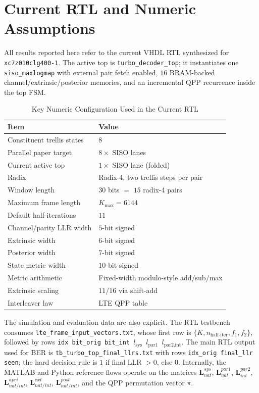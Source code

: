 \documentclass[conference]{IEEEtran}
\begin{document}
\section{Current RTL and Numeric Assumptions}
All results reported here refer to the current VHDL RTL synthesized for \texttt{xc7z010clg400-1}. The active top is \texttt{turbo\_decoder\_top}; it instantiates one \texttt{siso\_maxlogmap} with external pair fetch enabled, \(16\) BRAM-backed channel/extrinsic/posterior memories, and an incremental QPP recurrence inside the top FSM.

\begin{table}[t]
\caption{Key Numeric Configuration Used in the Current RTL}
\label{tab:numerics}
\centering
\footnotesize
\begin{tabular}{>{\raggedright\arraybackslash}p{} >{\raggedright\arraybackslash}p{}}
\toprule
Item & Value \\
\midrule
Constituent trellis states & \(8\) \\
Parallel paper target & \(8\times\) SISO lanes \\
Current active top & \(1\times\) SISO lane (folded) \\
Radix & Radix-4, two trellis steps per pair \\
Window length & \(30\) bits \(=\) \(15\) radix-4 pairs \\
Maximum frame length & \(K_{\max}=6144\) \\
Default half-iterations & \(11\) \\
Channel/parity LLR width & \(5\)-bit signed \\
Extrinsic width & \(6\)-bit signed \\
Posterior width & \(7\)-bit signed \\
State metric width & \(10\)-bit signed \\
Metric arithmetic & Fixed-width modulo-style add/sub/max \\
Extrinsic scaling & \(11/16\) via shift-add \\
Interleaver law & LTE QPP table \\
\bottomrule
\end{tabular}
\end{table}

The simulation and evaluation data are also explicit. The RTL testbench consumes \texttt{lte\_frame\_input\_vectors.txt}, whose first row is \(\{K,n_{\text{half-iter}},f_1,f_2\}\), followed by rows
\texttt{idx bit\_orig bit\_int \(l_{\text{sys}}\) \(l_{\text{par1}}\) \(l_{\text{par2,int}}\)}.
The main RTL output used for BER is \texttt{tb\_turbo\_top\_final\_llrs.txt} with rows
\texttt{idx\_orig final\_llr seen}; the hard decision rule is \(1\) if final LLR \(>0\), else \(0\).
Internally, the MATLAB and Python reference flows operate on the matrices
\(\mathbf{L}^{sys}_{nat}\), \(\mathbf{L}^{par1}_{nat}\), \(\mathbf{L}^{par2}_{int}\),
\(\mathbf{L}^{apri}_{nat/int}\), \(\mathbf{L}^{ext}_{nat/int}\), \(\mathbf{L}^{post}_{nat/int}\),
and the QPP permutation vector \(\pi\).
\end{document}
